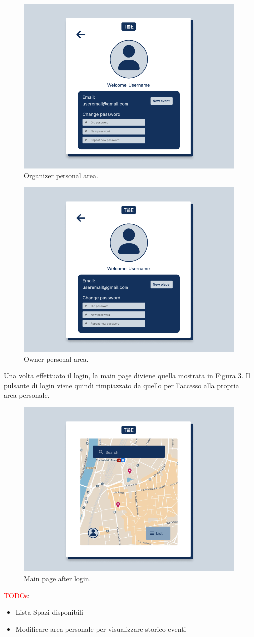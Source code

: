 \documentclass[9pt]{extarticle}
\begin{document}
\begin{figure}[!htb]
	\centering
	\includegraphics[width=.7\linewidth]{./images/OrganizerPersonalArea.pdf}
	\caption{Organizer personal area.}
	\label{fig:organizerPersonalArea}
\end{figure}
\newpage

\begin{figure}[!htb]
	\centering
	\includegraphics[width=.7\linewidth]{./images/OwnerPersonalArea.pdf}
	\caption{Owner personal area.}
	\label{fig:ownerPersonalArea}
\end{figure}

Una volta effettuato il login, la main page diviene quella mostrata in Figura \ref{fig:seeAvailableLocations}. Il pulsante di login viene quindi rimpiazzato da quello per l'accesso alla propria area personale.

\begin{figure}[!htb]
	\centering
	\includegraphics[width=.7\linewidth]{./images/SeeAvailableLocations.pdf}
	\caption{Main page after login.}
	\label{fig:seeAvailableLocations}
\end{figure}


\textcolor{red}{TODOs}:
\begin{itemize}
	\item Lista Spazi disponibili
	\item Modificare area personale per visualizzare storico eventi
\end{itemize}
\end{document}
